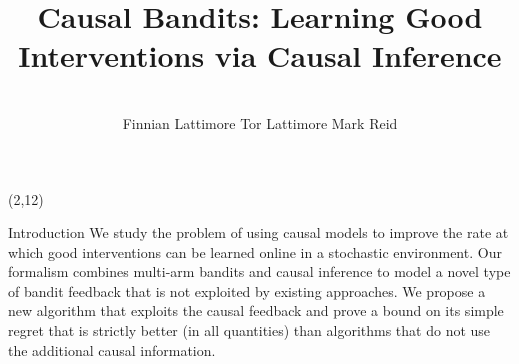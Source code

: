 \documentclass[nofooter,landscape,scale=1.4]{poster}
\title{Causal Bandits: Learning Good Interventions via Causal Inference}
\author{\mbox{}\\[1.3cm] Finnian Lattimore \hspace{2cm} Tor Lattimore \hspace{2cm} Mark Reid}
\date{}
\begin{document}
\begin{frame}

\begin{textblock}{25.33}(2,12)
\begin{block}{Introduction}
\justifying
We study the problem of using causal models to improve the rate at which good interventions can be learned online in a stochastic environment. 
Our formalism combines multi-arm bandits and causal inference to model a novel type of bandit feedback that is not exploited by existing approaches.
We propose a new algorithm that exploits the causal feedback and prove a bound on its simple regret that is strictly better (in all quantities) 
than algorithms that do not use the additional causal information.

\end{block}


\end{textblock}
\end{frame}
\end{document}
